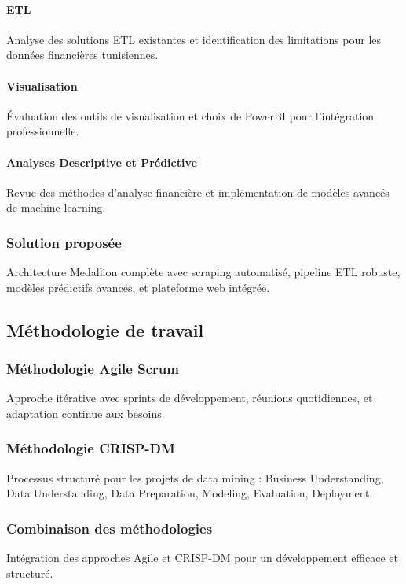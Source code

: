 \paragraph{ETL}
Analyse des solutions ETL existantes et identification des limitations pour les données financières tunisiennes.

\paragraph{Visualisation}
Évaluation des outils de visualisation et choix de PowerBI pour l'intégration professionnelle.

\paragraph{Analyses Descriptive et Prédictive}
Revue des méthodes d'analyse financière et implémentation de modèles avancés de machine learning.

\subsubsection{Solution proposée}
Architecture Medallion complète avec scraping automatisé, pipeline ETL robuste, modèles prédictifs avancés, et plateforme web intégrée.

\subsection{Méthodologie de travail}
\subsubsection{Méthodologie Agile Scrum}
Approche itérative avec sprints de développement, réunions quotidiennes, et adaptation continue aux besoins.

\subsubsection{Méthodologie CRISP-DM}
Processus structuré pour les projets de data mining : Business Understanding, Data Understanding, Data Preparation, Modeling, Evaluation, Deployment.

\subsubsection{Combinaison des méthodologies}
Intégration des approches Agile et CRISP-DM pour un développement efficace et structuré.
